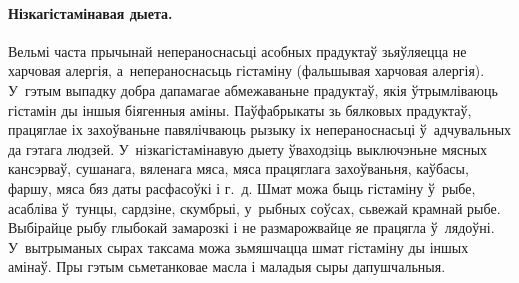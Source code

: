 \paragraph{Нізкагістамінавая дыета.}
Вельмі часта прычынай непераноснасьці асобных прадуктаў зьяўляецца не харчовая алергія, а~непераноснасьць гістаміну (фальшывая харчовая алергія). У~гэтым выпадку добра дапамагае абмежаваньне прадуктаў, якія ўтрымліваюць гістамін ды іншыя біягенныя аміны. Паўфабрыкаты зь бялковых прадуктаў, працяглае іх захоўваньне павялічваюць рызыку іх непераноснасьці ў~адчувальных да гэтага людзей. У~нізкагістамінавую дыету ўваходзіць выключэньне мясных кансэрваў, сушанага, вяленага мяса, мяса працяглага захоўваньня, каўбасы, фаршу, мяса бяз даты расфасоўкі і г.~д. Шмат можа быць гістаміну ў~рыбе, асабліва ў~тунцы, сардзіне, скумбрыі, у~рыбных соўсах, сьвежай крамнай рыбе. Выбірайце рыбу глыбокай замарозкі і не размарожвайце яе працягла ў~лядоўні. У~вытрыманых сырах таксама можа зьмяшчацца шмат гістаміну ды іншых амінаў. Пры гэтым сьметанковае масла і маладыя сыры дапушчальныя.
